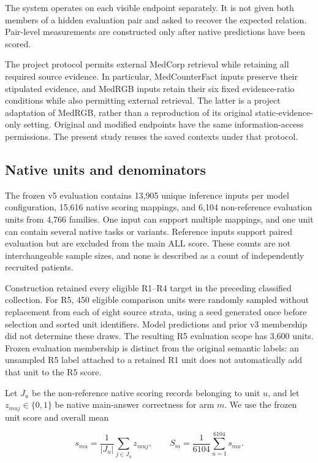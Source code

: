 \documentclass[
  english,
  11pt,
]{article}
\newcounter{none} %
\begin{document}
The system operates on each visible endpoint separately. It is not given
both members of a hidden evaluation pair and asked to recover the
expected relation. Pair-level measurements are constructed only after
native predictions have been scored.

The project protocol permits external MedCorp retrieval while retaining
all required source evidence. In particular, MedCounterFact inputs
preserve their stipulated evidence, and MedRGB inputs retain their six
fixed evidence-ratio conditions while also permitting external
retrieval. The latter is a project adaptation of MedRGB, rather than a
reproduction of its original static-evidence-only setting. Original and
modified endpoints have the same information-access permissions. The
present study reuses the saved contexts under that protocol.

\subsection{Native units and
denominators}\label{native-units-and-denominators}

The frozen v5 evaluation contains 13,905 unique inference inputs per
model configuration, 15,616 native scoring mappings, and 6,104
non-reference evaluation units from 4,766 families. One input can
support multiple mappings, and one unit can contain several native tasks
or variants. Reference inputs support paired evaluation but are excluded
from the main ALL score. These counts are not interchangeable sample
sizes, and none is described as a count of independently recruited
patients.

Construction retained every eligible R1--R4 target in the preceding
classified collection. For R5, 450 eligible comparison units were
randomly sampled without replacement from each of eight source strata,
using a seed generated once before selection and sorted unit
identifiers. Model predictions and prior v3 membership did not determine
these draws. The resulting R5 evaluation scope has 3,600 units. Frozen
evaluation membership is distinct from the original semantic labels: an
unsampled R5 label attached to a retained R1 unit does not automatically
add that unit to the R5 score.

Let \(J_u\) be the non-reference native scoring records belonging to
unit \(u\), and let \(z_{muj}\in\{0,1\}\) be native main-answer
correctness for arm \(m\). We use the frozen unit score and overall mean

\[
s_{mu}=\frac{1}{|J_u|}\sum_{j\in J_u}z_{muj},
\qquad
S_m=\frac{1}{6104}\sum_{u=1}^{6104}s_{mu}.
\]
\end{document}
